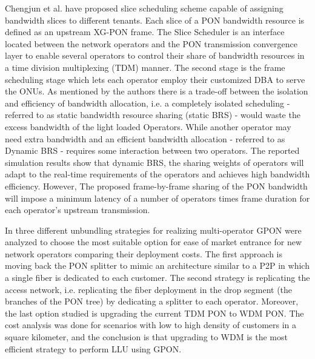 Chengjun et al. \cite{7744444,7876161} have proposed slice scheduling scheme capable of assigning bandwidth slices to different tenants. Each slice of a \ac{PON} bandwidth resource is defined as an upstream XG-PON frame. The Slice Scheduler is an interface located between the network operators and the \ac{PON} transmission convergence layer to enable several operators to control their share of bandwidth resources in a time division multiplexing (TDM) manner. The second stage is the frame scheduling stage which lets each operator employ their customized \ac{DBA} to serve the \acp{ONU}. As mentioned by the authors there is a trade-off between the isolation and efficiency of bandwidth allocation, i.e. a completely isolated scheduling - referred to as static bandwidth resource sharing (static BRS) - would waste the excess bandwidth of the light loaded Operators. While another operator may need extra bandwidth and an efficient bandwidth allocation - referred to as Dynamic BRS - requires some interaction between two operators. The reported simulation results show that dynamic BRS, the sharing weights of operators will adapt to the real-time requirements of the operators and achieves high bandwidth efficiency.
However, The proposed frame-by-frame sharing of the \ac{PON} bandwidth will impose a minimum latency of a number of operators times frame duration for each operator's upstream transmission.

In \cite{6381701} three different unbundling strategies for realizing multi-operator \ac{GPON} were analyzed to choose the most suitable option for ease of market entrance for new network operators comparing their deployment costs. The first approach is moving back the \ac{PON} splitter to mimic an architecture similar to a P2P in which a single fiber is dedicated to each customer. The second strategy is replicating the access network, i.e. replicating the fiber deployment in the drop segment (the branches of the \ac{PON} tree) by dedicating a splitter to each operator. Moreover, the last option studied is upgrading the current TDM \ac{PON} to WDM PON. The cost analysis was done for scenarios with low to high density of customers in a square kilometer, and the conclusion is that upgrading to WDM is the most efficient strategy to perform LLU using \ac{GPON}.

